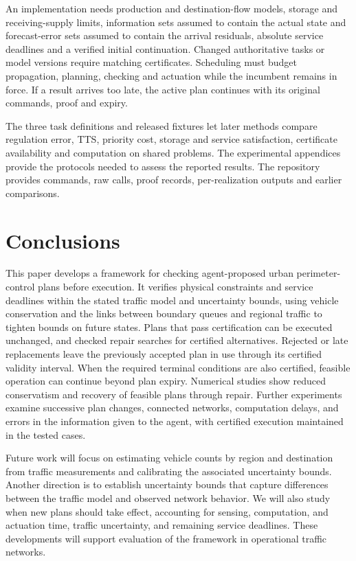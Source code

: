 \documentclass[journal,10pt]{IEEEtran}
\begin{document}
An implementation needs production and destination-flow models, storage and
receiving-supply limits, information sets assumed to contain the actual state and
forecast-error sets assumed to contain the arrival residuals, absolute
service deadlines and a verified initial continuation. Changed authoritative
tasks or model versions require matching certificates. Scheduling must budget
propagation, planning, checking and actuation while the incumbent remains in
force. If a result arrives too late, the active plan continues with its original
commands, proof and expiry.

The three task definitions and released fixtures let later methods compare
regulation error, TTS, priority cost, storage and service satisfaction,
certificate availability and computation on shared problems. The experimental
appendices provide the protocols needed to assess the reported results. The
repository provides commands, raw calls, proof records, per-realization outputs
and earlier comparisons.

\section{Conclusions}
\label{sec:new-conclusion}

This paper develops a framework for checking agent-proposed urban
perimeter-control plans before execution. It verifies physical constraints
and service deadlines within the stated traffic model and uncertainty
bounds, using vehicle conservation and the links between boundary queues and
regional traffic to tighten bounds on future states. Plans that pass
certification can be executed unchanged, and checked repair searches for
certified alternatives. Rejected or late replacements leave the previously
accepted plan in use through its certified validity interval. When the
required terminal conditions are also certified, feasible operation can
continue beyond plan expiry. Numerical studies show reduced conservatism and
recovery of feasible plans through repair. Further experiments examine
successive plan changes, connected networks, computation delays, and errors
in the information given to the agent, with certified execution maintained
in the tested cases.

Future work will focus on estimating vehicle counts by region and
destination from traffic measurements and calibrating the associated
uncertainty bounds. Another direction is to establish uncertainty bounds
that capture differences between the traffic model and observed network
behavior. We will also study when new plans should take effect, accounting
for sensing, computation, and actuation time, traffic uncertainty, and
remaining service deadlines. These developments will support evaluation of
the framework in operational traffic networks.
\end{document}
